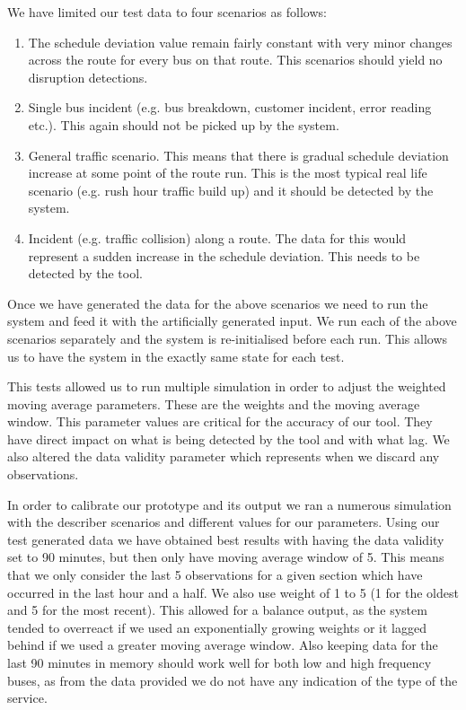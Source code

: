We have limited our test data to four scenarios as follows:
\begin{enumerate}
	\item The schedule deviation value remain fairly constant with very minor changes across the route for every bus on that route. This scenarios should yield no disruption detections.
	\item Single bus incident (e.g. bus breakdown, customer incident, error reading etc.). This again should not be picked up by the system.
	\item General traffic scenario. This means that there is gradual schedule deviation increase at some point of the route run. This is the most typical real life scenario (e.g. rush hour traffic build up) and it should be detected by the system.
	\item Incident (e.g. traffic collision) along a route. The data for this would represent a sudden increase in the schedule deviation. This needs to be detected by the tool.
\end{enumerate}

Once we have generated the data for the above scenarios we need to run the system and feed it with the artificially generated input. We run each of the above scenarios separately and the system is re-initialised before each run. This allows us to have the system in the exactly same state for each test.

This tests allowed us to run multiple simulation in order to adjust the weighted moving average parameters. These are the weights and the moving average window. This parameter values are critical for the accuracy of our tool. They have direct impact on what is being detected by the tool and with what lag. We also altered the data validity parameter which represents when we discard any observations.

In order to calibrate our prototype and its output we ran a numerous simulation with the describer scenarios and different values for our parameters. Using our test generated data we have obtained best results with having the data validity set to 90 minutes, but then only have moving average window of 5. This means that we only consider the last 5 observations for a given section which have occurred in the last hour and a half. We also use weight of 1 to 5 (1 for the oldest and 5 for the most recent). This allowed for a balance output, as the system tended to overreact if we used an exponentially growing weights or it lagged behind if we used a greater moving average window. Also keeping data for the last 90 minutes in memory should work well for both low and high frequency buses, as from the data provided we do not have any indication of the type of the service.

